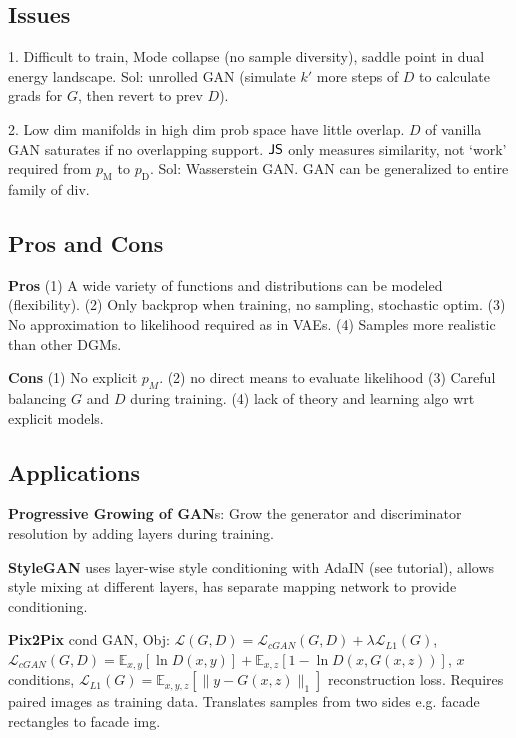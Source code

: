 \subsection*{Issues}

1. Difficult to train, Mode collapse (no sample diversity), saddle point in dual energy landscape. Sol: unrolled GAN (simulate $k'$ more steps of $D$ to calculate grads for $G$, then revert to prev $D$).

2. Low dim manifolds in high dim prob space have little overlap. \(D\) of vanilla GAN saturates if no overlapping support. \(\operatorname{\mathsf{JS}}\) only measures similarity, not `work' required from \(p_{\text {M}}\) to  \(p_{\text {D}}\). Sol: Wasserstein GAN. GAN can be generalized to entire family of div.

\subsection*{Pros and Cons}
\textbf{Pros} (1) A wide variety of functions and distributions can be modeled (flexibility). (2) Only backprop when training, no sampling, stochastic optim. (3)  No approximation to likelihood required as in VAEs. (4) Samples more realistic than other DGMs.

\textbf{Cons} (1) No explicit \(p_{M}\). (2) no direct means to evaluate likelihood (3) Careful balancing \(G\) and \(D\) during training. (4) lack of theory and learning algo wrt explicit models.

\subsection*{Applications}

\textbf{Progressive Growing of GAN}s:  Grow the generator and discriminator resolution by adding layers during training.

\textbf{StyleGAN} uses layer-wise style conditioning with AdaIN (see tutorial), allows style mixing at different layers, has separate mapping network to provide conditioning.

\textbf{Pix2Pix} cond GAN, Obj: \(\mathcal{L}(G, D)=\mathcal{L}_{c G A N}(G, D)+\lambda \mathcal{L}_{L 1}(G)\), \(\mathcal{L}_{{cGAN}}(G, D)=\mathbb{E}_{x, y}[\ln D(x, y)]+\mathbb{E}_{x, z}[1-\ln D(x, G(x, z))]\), \(x\) conditions, \(\mathcal{L}_{L 1}(G)=\mathbb{E}_{x, y, z}[\|y-G(x, z)\|_{1}]\) reconstruction loss. Requires paired images as training data. Translates samples from two sides e.g. facade rectangles to facade img.

